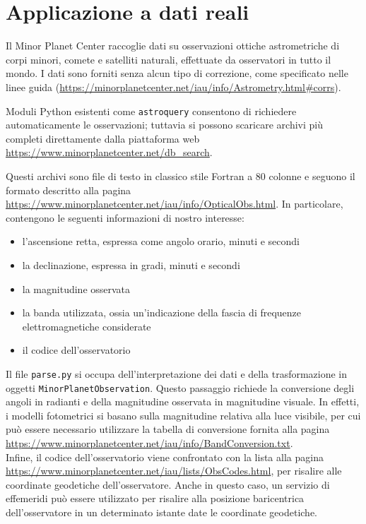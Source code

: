 \documentclass[12pt,a4paper,openright,twoside]{book}
\begin{document}
\section{Applicazione a dati reali}

Il Minor Planet Center raccoglie dati su osservazioni ottiche astrometriche di corpi minori, comete e satelliti naturali, effettuate da osservatori in tutto il mondo. I dati sono forniti senza alcun tipo di correzione, come specificato nelle linee guida (\url{https://minorplanetcenter.net/iau/info/Astrometry.html#corrs}).

Moduli Python esistenti come \lstinline{astroquery} consentono di richiedere automaticamente le osservazioni; tuttavia si possono scaricare archivi più completi direttamente dalla piattaforma web \url{https://www.minorplanetcenter.net/db_search}.

Questi archivi sono file di testo in classico stile Fortran a 80 colonne e seguono il formato descritto alla pagina \url{https://www.minorplanetcenter.net/iau/info/OpticalObs.html}. In particolare, contengono le seguenti informazioni di nostro interesse:
\begin{itemize}
\item l'ascensione retta, espressa come angolo orario, minuti e secondi
\item la declinazione, espressa in gradi, minuti e secondi
\item la magnitudine osservata
\item la banda utilizzata, ossia un'indicazione della fascia di frequenze elettromagnetiche considerate
\item il codice dell'osservatorio
\end{itemize}
Il file \lstinline{parse.py} si occupa dell'interpretazione dei dati e della trasformazione in oggetti \lstinline{MinorPlanetObservation}. Questo passaggio richiede la conversione degli angoli in radianti e della magnitudine osservata in magnitudine visuale. In effetti, i modelli fotometrici si basano sulla magnitudine relativa alla luce visibile, per cui può essere necessario utilizzare la tabella di conversione fornita alla pagina \url{https://www.minorplanetcenter.net/iau/info/BandConversion.txt}. \\
Infine, il codice dell'osservatorio viene confrontato con la lista alla pagina \url{https://www.minorplanetcenter.net/iau/lists/ObsCodes.html}, per risalire alle coordinate geodetiche dell'osservatore. Anche in questo caso, un servizio di effemeridi può essere utilizzato per risalire alla posizione baricentrica dell'osservatore in un determinato istante date le coordinate geodetiche. \pagebreak
\end{document}
